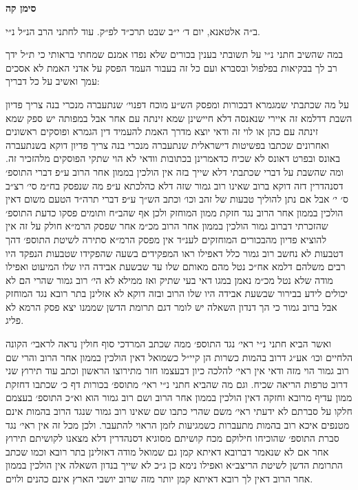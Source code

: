 \documentclass[12pt, openany]{book}
\newcommand{\chapname}{}
\newcommand{\newchap}[1]{
	\addcontentsline{toc}{chapter}{#1}
	\renewcommand{\chapname}{#1}
		\begin{center}
			\textbf{%
\fontsize{16pt}{16pt}\selectfont
				#1}
		\end{center}
}
\begin{document}
\newchap{סימן קה}
\begin{multicols}{2}
ב״ה אלטאנא, יום ד׳ י״ב שבט תרכ״ד לפ״ק. עוד לחתני הרב הנ״ל נ״י.\\\vspace{0pt}

במה שהשיב חתני נ״י על תשובתי בענין בכורים שלא נפדו אמנם שמחתי בראותי כי ת״ל ידך רב לך בבקיאות בפלפול ובסברא ועם כל זה בעבור העמד הפסק על אדני האמת לא אסכים עמך ואשיב על כל דבריך:\\\vspace{0pt}

על מה שכתבתי שמגמרא דבכורות ומפסק הש״ע מוכח דפנוי׳ שנתעברה מנכרי בנה צריך פדיון השבת דדלמא זה איירי שנאנסה דלא חיישינן שמא זינתה עם אחר אבל במפותה יש ספק שמא זינתה עם כהן או לוי זה ודאי יוצא מדרך האמת להעמיד דין הגמרא ופוסקים ראשונים ואחרונים שכתבו בפשיטות דישראלית שנתעברה מנכרי בנה צריך פדיון דוקא בשנתעברה באונס ובפרט דאונס לא שכיח כדאמרינן בכתובות וודאי לא הוי שתקי הפוסקים מלהזכיר זה. ומה שהשבת על דברי שכתבתי דלא שייך בזה אין הולכין בממון אחר הרוב ע״פ דברי התוספ׳ דסנהדרין דזה דוקא ברוב שאינו רוב גמור שזה דלא כהלכתא ע״פ מה שנפסק בח״מ סי׳ רצ״ב ס׳ י׳ אבל אם נתן להוליך טבעות של זהב וכו׳ וכתב הש״ך ע״פ דברי תרה״ד הטעם משום דאין הולכין בממון אחר הרוב נגד חזקת ממון המוחזק ולכן אף שהב״ח ותומים פסקו כדעת התוספ׳ שהזכרתי דברוב גמור הולכין בממון אחר הרוב מכ״מ אחר שפסק הרמ״א חולק על זה אין להוציא פדיון מהבכורים המוחזקים לענ״ד אין מפסק הרמ״א סתירה לשיטת התוספ׳ דהך דטבעות לא נחשב רוב גמור כלל דאפילו ראו המפקידים בשעה שהפקידו שטבעות הנפקד היו רבים משלהם דלמא אח״כ נטל מהם מאותם שלו עד שבשעת אבידה היו שלו המיעוט ואפילו מודה שלא נטל מכ״מ נאמן במגו דאי בעי שתיק ואז ממילא לא הי׳ רוב גמור שהרי הם לא יכולים לידע בבירור שבשעת אבידה היו שלו הרוב ובזה דוקא לא אזלינן בתר רובא נגד המוחזק אבל ברוב גמור כי הך דנדון השאלה יש לומר דגם תרומת הדשן שממנו יצא פסק הרמא לא פליג.\\\vspace{0pt}

ואשר הביא חתני נ״י ראי׳ נגד התוספ׳ ממה שכתב המרדכי סוף חולין נראה לראבי׳ הקונה הלחיים וכו׳ אע״ג דרוב בהמות כשרות הן קיי״ל כשמואל דאין הולכין בממון אחר הרוב והרי שם רוב גמור הוי מזה ודאי אין ראי׳ להלכה כיון דבעצמו חזר מתירוצו הראשון וכתב עוד תירוץ שני דרוב טרפות הריאה שכיח. וגם מה שהביא חתני נ״י ראי׳ מתוספ׳ בכורות דף כ׳ שכתבו דחזקת ממון עדיף מרובא וחזקה דאין הולכין בממון אחר הרוב ושם רוב גמור הוא וא״כ התוספ׳ בעצמם חלקו על סברתם לא ידעתי ראי׳ משם שהרי כתבו שם שאינו רוב גמור שנגד הרוב בהמות אינם מטנפים איכא רוב בהמות מתעברות כשמגיעות לזמן הראוי להתעבר. ולכן מכל זה אין ראי׳ נגד סברת התוספ׳ שהוכיחו חילוקם מכח קושיתם מסוגיא דסנהדרין דלא מצאנו לקושיתם תירוץ אחר אם לא שנאמר דברובא דאיתא קמן גם שמואל מודה דאזלינן בתר רובא וכמו שכתב התרומת הדשן לשיטת הריצב״א ואפילו נימא כן ג״כ לא שייך בנדון השאלה אין הולכין בממון אחר הרוב דאין לך רובא דאיתא קמן יותר מזה שרוב יושבי הארץ אינם כהנים ולוים.\\\vspace{0pt}


\end{multicols}
\end{document}
